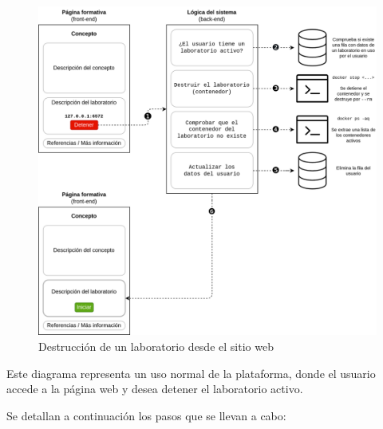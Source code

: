             \begin{figure}
                \centering

                \includegraphics[scale=0.125]{images/Diagramas/detener.png}

                \caption{Destrucción de un laboratorio desde el sitio web}
                    \label{fig:detener-laboratorio}
            \end{figure}

            Este diagrama representa un uso normal de la plataforma, donde el usuario accede a la página web y desea detener el laboratorio activo.

            Se detallan a continuación los pasos que se llevan a cabo:

